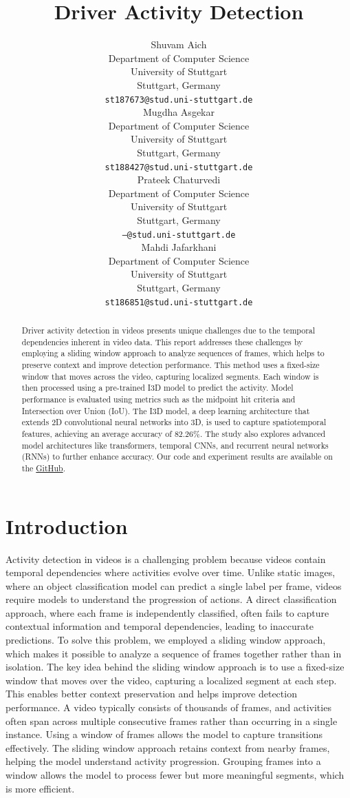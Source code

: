 \documentclass{article}
\title{Driver Activity Detection}
\author{%
  Shuvam Aich \\
  Department of Computer Science\\
  University of Stuttgart\\
  Stuttgart, Germany \\
  \texttt{st187673@stud.uni-stuttgart.de} \\
  \And
  Mugdha Asgekar \\
  Department of Computer Science\\
  University of Stuttgart\\
  Stuttgart, Germany \\
  \texttt{st188427@stud.uni-stuttgart.de} \\
  \AND
  Prateek Chaturvedi \\
  Department of Computer Science\\
  University of Stuttgart\\
  Stuttgart, Germany \\
  \texttt{---@stud.uni-stuttgart.de} \\
  \And
  Mahdi Jafarkhani \\
  Department of Computer Science\\
  University of Stuttgart\\
  Stuttgart, Germany \\
  \texttt{st186851@stud.uni-stuttgart.de} \\
}
\begin{document}
\maketitle


\begin{abstract}
Driver activity detection in videos presents unique challenges due to the temporal dependencies inherent in video data. This report addresses these challenges by employing a sliding window approach to analyze sequences of frames, which helps to preserve context and improve detection performance. This method uses a fixed-size window that moves across the video, capturing localized segments. Each window is then processed using a pre-trained I3D model to predict the activity. Model performance is evaluated using metrics such as the midpoint hit criteria and Intersection over Union (IoU). The I3D model, a deep learning architecture that extends 2D convolutional neural networks into 3D, is used to capture spatiotemporal features, achieving an average accuracy of 82.26\%. The study also explores advanced model architectures like transformers, temporal CNNs, and recurrent neural networks (RNNs) to further enhance accuracy. Our code and experiment results are available on
the \href{https://github.com/M-Jafarkhani/DriveAndActInferenceDemo}{GitHub}.
\end{abstract}


\section{Introduction}

Activity detection in videos is a challenging problem because videos contain temporal dependencies where activities evolve over time. Unlike static images, where an object classification model can predict a single label per frame, videos require models to understand the progression of actions. A direct classification approach, where each frame is independently classified, often fails to capture contextual information and temporal dependencies, leading to inaccurate predictions. To solve this problem, we employed a sliding window approach, which makes it possible to analyze a sequence of frames together rather than in isolation. The key idea behind the sliding window approach is to use a fixed-size window that moves over the video, capturing a localized segment at each step. This enables better context preservation and helps improve detection performance. A video typically consists of thousands of frames, and activities often span across multiple consecutive frames rather than occurring in a single instance. Using a window of frames allows the model to capture transitions effectively. The sliding window approach retains context from nearby frames, helping the model understand activity progression. Grouping frames into a window allows the model to process fewer but more meaningful segments, which is more efficient.
\end{document}
